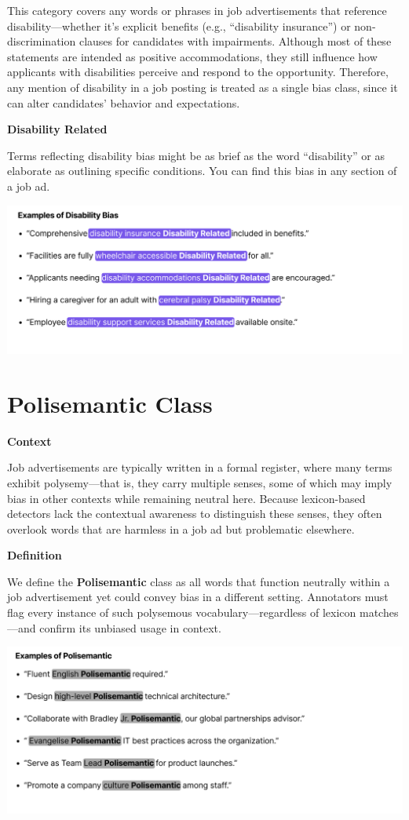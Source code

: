 \documentclass[
]{book}
\begin{document}
This category covers any words or phrases in job advertisements that reference disability---whether it's explicit benefits (e.g., ``disability insurance'') or non-discrimination clauses for candidates with impairments. Although most of these statements are intended as positive accommodations, they still influence how applicants with disabilities perceive and respond to the opportunity. Therefore, any mention of disability in a job posting is treated as a single bias class, since it can alter candidates' behavior and expectations.

{\textbf{Disability Related}}

Terms reflecting disability bias might be as brief as the word ``disability'' or as elaborate as outlining specific conditions. You can find this bias in any section of a job ad.

\includegraphics{images/Disability-Related.png}

\chapter{Polisemantic Class}\label{polisemantic}

\textbf{Context}

Job advertisements are typically written in a formal register, where many terms exhibit polysemy---that is, they carry multiple senses, some of which may imply bias in other contexts while remaining neutral here. Because lexicon-based detectors lack the contextual awareness to distinguish these senses, they often overlook words that are harmless in a job ad but problematic elsewhere.

\textbf{Definition}

We define the {\textbf{Polisemantic}} class as all words that function neutrally within a job advertisement yet could convey bias in a different setting. Annotators must flag every instance of such polysemous vocabulary---regardless of lexicon matches---and confirm its unbiased usage in context.

\includegraphics{images/Polisemantic.png}
\end{document}
